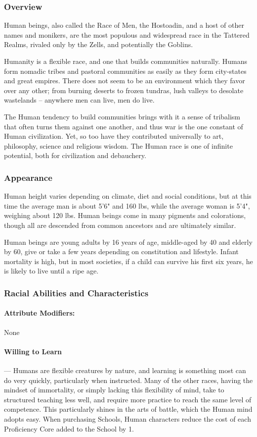\documentclass[oneside,11pt,english]{book}
\begin{document}
\subsubsection*{Overview}
Human beings, also called the Race of Men, the Hostoadin, and a host of other names and monikers, are the most populous and widespread race in the Tattered Realms, rivaled only by the Zells, and potentially the Goblins. 


Humanity is a flexible race, and one that builds communities naturally. Humans form nomadic tribes and 
pastoral communities as easily as they form city-states and great empires. There does not seem to be an 
environment which they favor over any other; from burning deserts to frozen tundras, lush valleys to 
desolate wastelands -- anywhere men can live, men do live.


The Human tendency to build communities brings with it a sense of tribalism that often turns them 
against one another, and thus war is the one constant of Human civilization. Yet, so too have they 
contributed universally to art, philosophy, science and religious wisdom. The Human race is one of 
infinite potential, both for civilization and debauchery. 
 

\subsubsection*{Appearance} 
Human height varies depending on climate, diet and social conditions, but at this time the average man is about 5'6" and 160 lbs, while the average woman is 5'4", weighing about 120 lbs. Human beings come in many pigments and colorations, though all are descended from common ancestors and are ultimately 
similar.


Human beings are young adults by 16 years of age, middle-aged by 40 and elderly by 60, give or take a 
few years depending on constitution and lifestyle. Infant mortality is high, but in most societies, if a child can survive his first six years, he is likely to live until a ripe age.


\subsubsection*{Racial Abilities and Characteristics} 
\paragraph{Attribute Modifiers:} None
\paragraph{\label{par:Willing to Learn}Willing to Learn}---\quad
Humans are flexible creatures by nature, and learning is something most can do very quickly, 
particularly when instructed. Many of the other races, having the mindset of immortality, or 
simply lacking this flexibility of mind, take to structured teaching less well, and require more 
practice to reach the same level of competence. This particularly shines in the arts of battle, which 
the Human mind adopts easy. When purchasing Schools, Human characters reduce the cost of 
each Proficiency Core added to the School by 1. 
\end{document}
